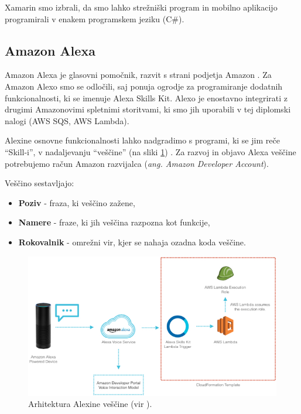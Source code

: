 \documentclass[a4paper, 12pt]{book}
\begin{document}
Xamarin smo izbrali, da smo lahko strežniški program in mobilno aplikacijo programirali v enakem programskem jeziku (C\#).



\subsection{Amazon Alexa}

Amazon Alexa je glasovni pomočnik, razvit s strani podjetja Amazon \cite{alexa}.
Za Amazon Alexo smo se odločili, saj ponuja ogrodje za programiranje dodatnih funkcionalnosti, ki se imenuje Alexa Skills Kit.
Alexo je enostavno integrirati z drugimi Amazonovimi spletnimi storitvami, ki smo jih uporabili v tej diplomski nalogi (AWS SQS, AWS Lambda).

Alexine osnovne funkcionalnosti lahko nadgradimo s programi, ki se jim reče \enquote{Skill-i}, v nadaljevanju \enquote{veščine} (na sliki \ref{alexa_architecture}) \cite{alexaskills}.
Za razvoj in objavo Alexa veščine potrebujemo račun Amazon razvijalca (\textit{ang. Amazon Developer Account}).

\noindent Veščino sestavljajo:
\begin{itemize}
	\item \textbf{Poziv} - fraza, ki veščino zažene,
	\item \textbf{Namere} - fraze, ki jih veščina razpozna kot funkcije,
	\item \textbf{Rokovalnik} - omrežni vir, kjer se nahaja ozadna koda veščine.
\end{itemize}

\begin{figure}[H]
\begin{center}
\includegraphics[width=13.5cm]{alexa_architecture}
\end{center}
	\caption{Arhitektura Alexine veščine (vir \cite{alexaarchitecture}).}
\label{alexa_architecture}
\end{figure}
\end{document}
